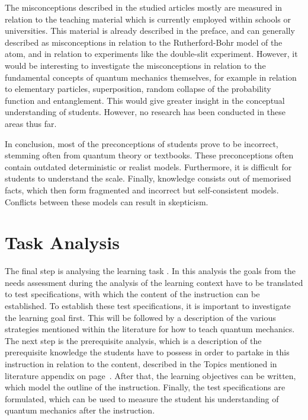 \documentclass[11pt,twoside]{report} %
\begin{document}
The misconceptions described in the studied articles mostly are measured in relation to the teaching material which is currently employed within schools or universities. This material is already described in the preface, and can generally described as misconceptions in relation to the Rutherford-Bohr model of the atom, and in relation to experiments like the double-slit experiment. However, it would be interesting to investigate the misconceptions in relation to the fundamental concepts of quantum mechanics themselves, for example in relation to elementary particles, superposition, random collapse of the probability function and entanglement. This would give greater insight in the conceptual understanding of students. However, no research has been conducted in these areas thus far.

In conclusion, most of the preconceptions of students prove to be incorrect, stemming often from quantum theory or textbooks. These preconceptions often contain outdated deterministic or realist models. Furthermore, it is difficult for students to understand the scale. Finally, knowledge consists out of memorised facts, which then form fragmented and incorrect but self-consistent models. Conflicts between these models can result in skepticism.


\chapter{Task Analysis}
\label{ch:taskanalysis}

The final step is analysing the learning task \cite{smithragan}. In this analysis the goals from the needs assessment during the analysis of the learning context have to be translated to test specifications, with which the content of the instruction can be established. To establish these test specifications, it is important to investigate the learning goal first. This will be followed by a description of the various strategies mentioned within the literature for how to teach quantum mechanics. The next step is the prerequisite analysis, which is a description of the prerequisite knowledge the students have to possess in order to partake in this instruction in relation to the content, described in the Topics mentioned in literature appendix on page~\pageref{app:topicsliterature}. After that, the learning objectives can be written, which model the outline of the instruction. Finally, the test specifications are formulated, which can be used to measure the student his understanding of quantum mechanics after the instruction.
\end{document}
